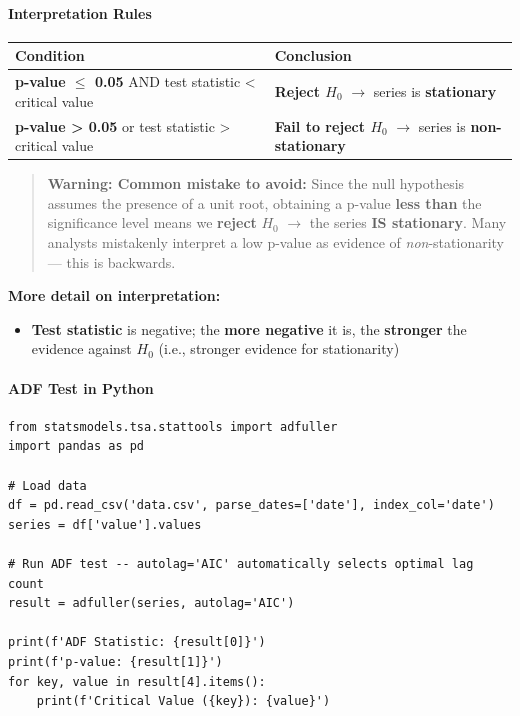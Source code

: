 \documentclass[12pt,openany]{book}
\begin{document}
\paragraph{Interpretation Rules}

\begin{center}
\begin{tabular}{|L{0.28\textwidth}|L{0.62\textwidth}|}
\hline
Condition & Conclusion \\
\hline
\textbf{p-value \(\leq\) 0.05} AND test statistic < critical value & \textbf{Reject \(H_0\)} \(\rightarrow\) series is \textbf{stationary} \\
\hline
\textbf{p-value > 0.05} or test statistic > critical value & \textbf{Fail to reject \(H_0\)} \(\rightarrow\) series is \textbf{non-stationary} \\
\hline
\end{tabular}
\end{center}

\begin{quote}
\textbf{Warning: Common mistake to avoid:} Since the null hypothesis assumes the presence of a unit root, obtaining a p-value \textbf{less than} the significance level means we \textbf{reject} \(H_0\) \(\rightarrow\) the series \textbf{IS stationary}. Many analysts mistakenly interpret a low p-value as evidence of \textit{non}-stationarity --- this is backwards.\par

\end{quote}

\textbf{More detail on interpretation:}
\begin{itemize}[leftmargin=*]
    \item \textbf{Test statistic} is negative; the \textbf{more negative} it is, the \textbf{stronger} the evidence against \(H_0\) (i.e., stronger evidence for stationarity)
\end{itemize}

\paragraph{ADF Test in Python}

\begin{Verbatim}[breaklines=true,breakanywhere=true,fontsize=\small]
from statsmodels.tsa.stattools import adfuller
import pandas as pd

# Load data
df = pd.read_csv('data.csv', parse_dates=['date'], index_col='date')
series = df['value'].values

# Run ADF test -- autolag='AIC' automatically selects optimal lag count
result = adfuller(series, autolag='AIC')

print(f'ADF Statistic: {result[0]}')
print(f'p-value: {result[1]}')
for key, value in result[4].items():
    print(f'Critical Value ({key}): {value}')
\end{Verbatim}
\end{document}
